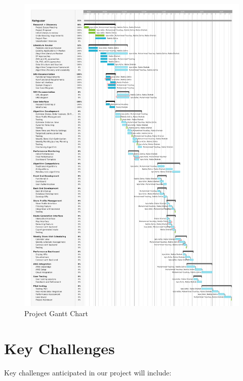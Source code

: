 \begin{center}
        \begin{figure}[H]
        \centering
        \includegraphics[width=\textwidth]{images/Rahguzar (2)-1.png} 
        \caption{Project Gantt Chart}
    \end{figure}
\end{center}

\section{Key Challenges}

Key challenges anticipated in our project will include:

